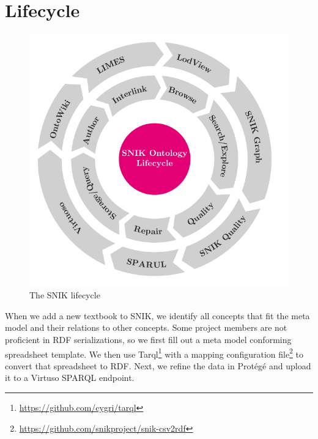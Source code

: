 \documentclass[conference]{IEEEtran}
\begin{document}
\section{Lifecycle}\label{sec:application}

\begin{figure}[ht]
\caption{The SNIK lifecycle}
\label{fig:lifecycle}
\includegraphics[width=\columnwidth]{cycle.pdf}
\end{figure}

When we add a new textbook to SNIK, we identify all concepts that fit the meta model and their relations to other concepts.
Some project members are not proficient in RDF serializations, so we first fill out a meta model conforming spreadsheet template.
We then use Tarql\footnote{\url{https://github.com/cygri/tarql}} with a mapping configuration file\footnote{\url{https://github.com/snikproject/snik-csv2rdf}} to convert that spreadsheet to RDF.
Next, we refine the data in Protégé and upload it to a Virtuso SPARQL endpoint.
\end{document}
